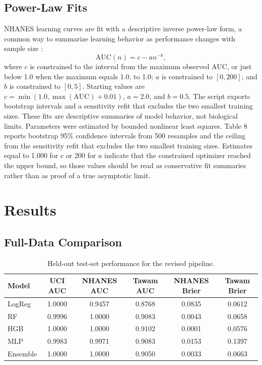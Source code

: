 \documentclass[12pt]{article}
\begin{document}
\subsection{Power-Law Fits}
NHANES learning curves are fit with a descriptive inverse power-law form, a common way to summarize learning behavior as performance changes with sample size \cite{meek2002,dayimu2024}:
\[
\mathrm{AUC}(n)=c-a n^{-b},
\]
where $c$ is constrained to the interval from the maximum observed AUC, or just below 1.0 when the maximum equals 1.0, to 1.0; $a$ is constrained to $[0,200]$; and $b$ is constrained to $[0,5]$. Starting values are $c=\min(1.0,\max(\mathrm{AUC})+0.01)$, $a=2.0$, and $b=0.5$. The script exports bootstrap intervals and a sensitivity refit that excludes the two smallest training sizes. These fits are descriptive summaries of model behavior, not biological limits.
Parameters were estimated by bounded nonlinear least squares. Table 8 reports bootstrap 95\% confidence intervals from 500 resamples and the ceiling from the sensitivity refit that excludes the two smallest training sizes. Estimates equal to 1.000 for $c$ or 200 for $a$ indicate that the constrained optimizer reached the upper bound, so those values should be read as conservative fit summaries rather than as proof of a true asymptotic limit.

\section{Results}
\subsection{Full-Data Comparison}
\begin{table}[H]
\centering
\caption{Held-out test-set performance for the revised pipeline.}
\begingroup
\small
\renewcommand{\arraystretch}{1.15}
\setlength{\tabcolsep}{5pt}
\begin{tabular}{|l|c|c|c|c|c|}
\hline
Model & UCI AUC & NHANES AUC & Tawam AUC & NHANES Brier & Tawam Brier \\
\hline
LogReg & 1.0000 & 0.9457 & 0.8768 & 0.0835 & 0.0612 \\
RF & 0.9996 & 1.0000 & 0.9083 & 0.0043 & 0.0658 \\
HGB & 1.0000 & 1.0000 & 0.9102 & 0.0001 & 0.0576 \\
MLP & 0.9983 & 0.9971 & 0.9083 & 0.0153 & 0.1397 \\
Ensemble & 1.0000 & 1.0000 & 0.9050 & 0.0033 & 0.0663 \\
\hline
\end{tabular}
\endgroup
\end{table}
\end{document}
